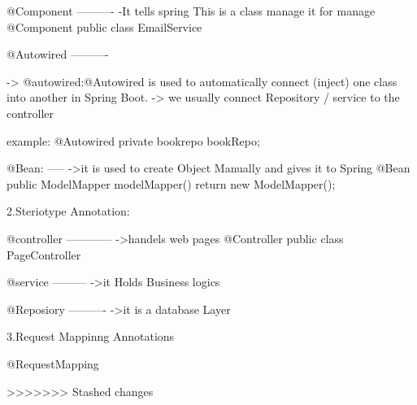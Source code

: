 @Component
----------
                  -It tells spring This is a class manage it for manage
                  @Component
                  public class EmailService {}

                        
@Autowired
----------

      ->  @autowired:@Autowired is used to automatically connect (inject) one class into another in Spring Boot.
      ->  we usually connect Repository / service to the controller

            example:
              @Autowired
             private bookrepo bookRepo;

@Bean:
-----
      ->it is used to create Object Manually and gives it to Spring
      @Bean
            public ModelMapper modelMapper()
            {
                  return new ModelMapper();
            }
        

2.Steriotype Annotation:

@controller
------------
            ->handels web pages 
                @Controller
                public class PageController {
                }

@service
---------
            ->it Holds Business logics


@Reposiory
----------
            ->it is a database Layer


3.Request Mappinng Annotations 

@RequestMapping
            
>>>>>>> Stashed changes

